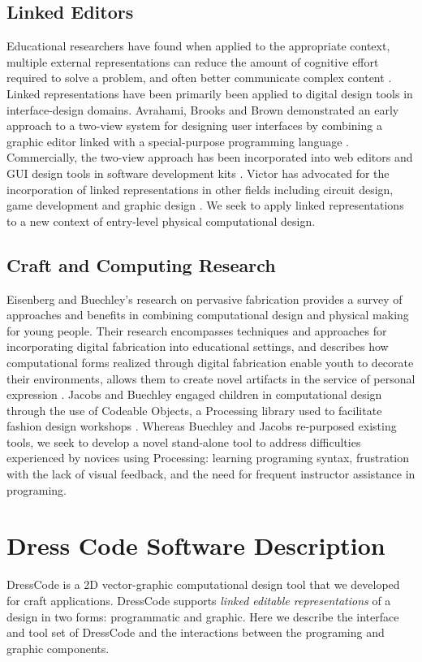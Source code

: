 \documentclass{sigchi}
\begin{document}
\subsection{Linked Editors}
Educational researchers have found when applied to the appropriate context, multiple external representations can reduce the amount of cognitive effort required to solve a problem, and often better communicate complex content \cite{ainsworth}. Linked representations have been primarily been applied to digital design tools in interface-design domains. Avrahami, Brooks and Brown demonstrated an early approach to a two-view system for designing user interfaces by combining a graphic editor linked with a special-purpose programming language \cite{two_view_ui}. Commercially, the two-view approach has been incorporated into web editors and GUI design tools in software development kits \cite{view_based}. Victor has advocated for the incorporation of linked representations in other fields including circuit design, game development and graphic design \cite{victor}. We seek to apply linked representations to a new context of entry-level physical computational design.

\subsection{Craft and Computing Research}
Eisenberg and Buechley's research on pervasive fabrication provides a survey of approaches and benefits in combining computational design and physical making for young people. Their research encompasses techniques and approaches for incorporating digital fabrication into educational settings, and describes how computational forms realized through digital fabrication enable youth to decorate their environments, allows them to create novel artifacts in the service of personal expression \cite{pervasive_fab}. Jacobs and Buechley engaged children in computational design through the use of Codeable Objects, a Processing library used to facilitate fashion design workshops \cite{codeable_objects}. Whereas Buechley and Jacobs re-purposed existing tools, we seek to develop a novel stand-alone tool to address difficulties experienced by novices using Processing: learning programing syntax, frustration with the lack of visual feedback, and the need for frequent instructor assistance in programing. 

\section{Dress Code Software Description}
DressCode is a 2D vector-graphic computational design tool that we developed for craft applications. DressCode supports \emph{linked editable representations} of a design in two forms: programmatic and graphic. Here we describe the interface and tool set of DressCode and the interactions between the programing and graphic components.
\end{document}
